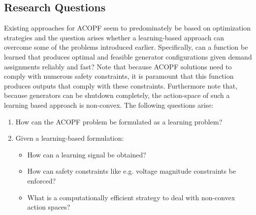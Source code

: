 \documentclass[11pt]{cmuthesis} %
\begin{document}
\newpage
\subsection{Research Questions}
Existing approaches for ACOPF seem to predominately be based on optimization strategies and the question arises whether a learning-based approach can overcome some of the problems introduced earlier. Specifically, can a function be learned that produces optimal and feasible generator configurations given demand assignments reliably and fast? Note that because ACOPF solutions need to comply with numerous safety constraints, it is paramount that this function produces outputs that comply with these constraints. Furthermore note that, because generators can be shutdown completely, the action-space of such a learning based approach is non-convex. The following questions arise:

\begin{enumerate}
    \item How can the ACOPF problem be formulated as a learning problem?
    \item Given a learning-based formulation:
     \begin{itemize}
        \item How can a learning signal be obtained?
        \item How can safety constraints like e.g. voltage magnitude constraints be enforced?
        \item What is a computationally efficient strategy to deal with non-convex action spaces?
    \end{itemize}
\end{enumerate}
\end{document}
